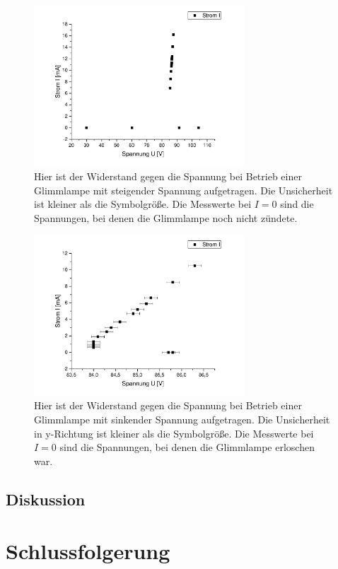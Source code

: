 \documentclass[
	a4paper,
	12pt,
	pagesize,
	ngerman
]{scrartcl}
\begin{document}
	\begin{figure}[H]
		\includegraphics[width=0.7\textwidth]{glimm_steig}
		\centering
		\caption{Hier ist der Widerstand gegen die Spannung bei Betrieb einer Glimmlampe mit steigender Spannung aufgetragen. Die Unsicherheit ist kleiner als die Symbolgröße. Die Messwerte bei $I=0$ sind die Spannungen, bei denen die Glimmlampe noch nicht zündete.}
		\label{glimm_steig}
		\centering
	\end{figure}
\begin{figure}[H]
	\includegraphics[width=0.7\textwidth]{glimm_fall}
	\centering
	\caption{Hier ist der Widerstand gegen die Spannung bei Betrieb einer Glimmlampe mit sinkender Spannung aufgetragen. Die Unsicherheit in y-Richtung ist kleiner als die Symbolgröße. Die Messwerte bei $I=0$ sind die Spannungen, bei denen die Glimmlampe erloschen war.}
	\label{glimm_fall}
	\centering
\end{figure}
	\subsection{Diskussion}
	
	\section{Schlussfolgerung}
	
\end{document}

